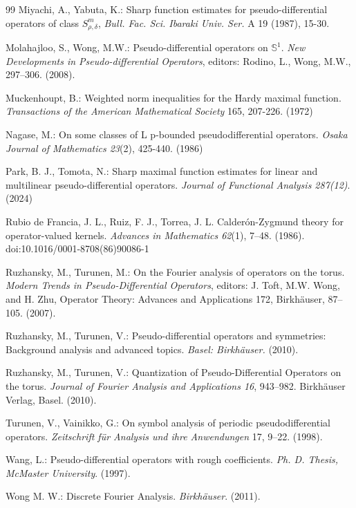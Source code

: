 \documentclass[12pt, reqno]{amsart}
\theoremstyle{definition}
\theoremstyle{remark}
\numberwithin{equation}{section}
\begin{document}
\begin{thebibliography}{99}
Miyachi, A., Yabuta, K.: Sharp function estimates for pseudo-differential operators of class $S^m_{\rho,\delta}$,
\textit{Bull. Fac. Sci. Ibaraki Univ. Ser.} A 19 (1987), 15-30.

Molahajloo, S.,  Wong, M.W.: Pseudo-differential operators on $\mathbb{S}^1$. \textit{New Developments in Pseudo-differential Operators}, editors: Rodino, L., Wong, M.W., 297–306. (2008).

Muckenhoupt, B.: Weighted norm inequalities for the Hardy maximal function. \textit{Transactions of the American Mathematical Society} 165, 207-226. (1972)

Nagase, M.: On some classes of L p-bounded pseudodifferential operators. \textit{Osaka Journal of Mathematics 23}(2),
425-440. (1986)

Park, B. J., Tomota, N.: Sharp maximal function estimates for linear and multilinear pseudo-differential operators. \textit{Journal of Functional Analysis 287(12)}. (2024) 

Rubio de Francia, J. L., Ruiz, F. J.,  Torrea, J. L. {Calderón-Zygmund theory for operator-valued kernels.} \textit{Advances in Mathematics 62}(1), 7–48. (1986). doi:10.1016/0001-8708(86)90086-1 


Ruzhansky, M.,  Turunen, M.: On the Fourier analysis of operators on the torus.\textit{ }\textit{Modern Trends in Pseudo-Differential Operators}, editors: J. Toft, M.W. Wong,
and H. Zhu, Operator Theory: Advances and Applications 172, Birkh\"auser,
87–105. (2007).

Ruzhansky, M.,  Turunen, V.: Pseudo-differential operators and symmetries: Background analysis and advanced topics. \textit{Basel: Birkh\"auser. } (2010).

Ruzhansky, M.,  Turunen, V.: Quantization of Pseudo-Differential Operators on the torus. \textit{Journal of Fourier
Analysis and Applications 16}, 943–982. Birkhäuser Verlag, Basel. (2010).

Turunen, V.,  Vainikko, G.: On symbol analysis of periodic pseudodifferential operators. \textit{Zeitschrift für Analysis und ihre Anwendungen} 17, 9–22. (1998).

Wang, L.: Pseudo-differential operators with rough coefficients. \textit{Ph. D. Thesis, McMaster University}. (1997).

Wong M. W.: Discrete Fourier Analysis. \textit{Birkhäuser}. (2011).


\end{thebibliography}
\end{document}
